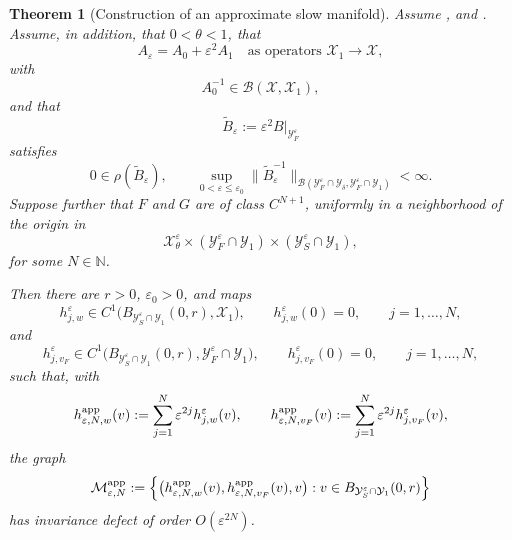 \documentclass[11pt]{article}
\newtheorem{theorem}{Theorem}[section]
\theoremstyle{definition}
\theoremstyle{remark}
\numberwithin{equation}{section}
\newcommand{\mc}[1]{\mathcal{#1}}
\begin{document}
\begin{theorem}[Construction of an approximate slow manifold]
\label{thm:approximate-slow-manifold}
Assume ,  and .
Assume, in addition, that \(0<\theta<1\), that
\[
A_\varepsilon=A_0+\varepsilon^2A_1
\quad\text{as operators } \mc X_1\to\mc X,
\]
with
\[
A_0^{-1}\in\mathcal B(\mc X,\mc X_1),
\]
and that
\[
\widetilde B_\varepsilon:=\varepsilon^2B|_{\mc Y_F^\varepsilon}
\]
satisfies
\[
0\in\rho(\widetilde B_\varepsilon),
\qquad
\sup_{0<\varepsilon\le\varepsilon_0}
\|\widetilde B_\varepsilon^{-1}\|_
{\mathcal B(\mc Y_F^\varepsilon\cap\mc Y_\delta,
             \mc Y_F^\varepsilon\cap\mc Y_1)}
<\infty .
\]
Suppose further that \(F\) and \(G\) are of class \(C^{N+1}\), uniformly in a
neighborhood of the origin in
\[
\mc X_\theta^\varepsilon
\times
(\mc Y_F^\varepsilon\cap\mc Y_1)
\times
(\mc Y_S^\varepsilon\cap\mc Y_1),
\]
for some \(N\in\mathbb N\).

Then there are \(r>0\), \(\varepsilon_0>0\), and maps
\[
h_{j,w}^\varepsilon
\in
C^1\bigl(
B_{\mc Y_S^\varepsilon\cap\mc Y_1}(0,r),\mc X_1
\bigr),
\qquad
h_{j,w}^\varepsilon(0)=0,
\qquad
j=1,\dots,N,
\]
and
\[
h_{j,v_F}^\varepsilon
\in
C^1\bigl(
B_{\mc Y_S^\varepsilon\cap\mc Y_1}(0,r),
\mc Y_F^\varepsilon\cap\mc Y_1
\bigr),
\qquad
h_{j,v_F}^\varepsilon(0)=0,
\qquad
j=1,\dots,N,
\]
such that, with
\[
h_{\varepsilon,N,w}^{\rm app}(v)
:=
\sum_{j=1}^N\varepsilon^{2j}h_{j,w}^\varepsilon(v),
\qquad
h_{\varepsilon,N,v_F}^{\rm app}(v)
:=
\sum_{j=1}^N\varepsilon^{2j}h_{j,v_F}^\varepsilon(v),
\]
the graph
\[
\mathcal M_{\varepsilon,N}^{\rm app}
:=
\left\{
\bigl(
h_{\varepsilon,N,w}^{\rm app}(v),
h_{\varepsilon,N,v_F}^{\rm app}(v),
v
\bigr):
v\in B_{\mc Y_S^\varepsilon\cap\mc Y_1}(0,r)
\right\}
\]
has invariance defect of order \(O(\varepsilon^{2N})\).


\end{theorem}
\end{document}
